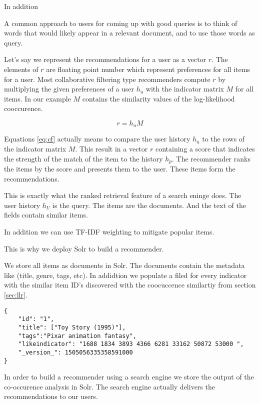 In addition 

A common approach to users for coming up with good queries is to think of words that would likely appear in a relevant document, and to use those words as query.

Let's say we represent the recommendations for a user as a vector $r$. The elements of $r$ are floating point number which represent preferences for all items for a user. Most collaborative filtering type recommenders compute $r$ by multiplying the given preferences of a user $h_u$ with the indicator matrix $M$ for all items. In our example $M$ contains the similarity values of the log-likelihood cooccurence.

\begin{equation}
  \label{eq:cf}
  r = h_u M
\end{equation}

Equations \ref{eq:cf} actually means to compare the user history $h_u$ to the rows of the indicator matrix $M$. This result in a vector $r$ containing a score that indicates the strength of the match of the item to the history $h_p$. The recommender ranks the items by the score and presents them to the user. These items form the recommendations.

This is exactly what the ranked retrieval feature of a search eninge does.
The user history $h_U$ is the query. The items are the documents. And the text of the fields contain similar items.

In addition we can use TF-IDF \cite{Manning} weighting to mitigate popular items.

This is why we deploy Solr to build a recommender.

We store all items as documents in Solr. The documents contain the metadata like (title, genre, tags, etc). In addidtion we populate a filed for every indicator with the similar item ID's discovered with the coocuccence similartiy from section \ref{sec:llr}.

\begin{lstlisting}[caption={Item metadata and similar items are stored in Solr.},label={lst:solrdoc}]
{
    "id": "1",
    "title": ["Toy Story (1995)"],
    "tags":"Pixar animation fantasy",
    "likeindicator": "1688 1834 3893 4366 6281 33162 50872 53000 ",
    "_version_": 1505056335358591000
}
\end{lstlisting}

In order to build a recommender using a search engine we store the output of the co-occurence analysis in Solr. The search engine actually delivers the recommendations to our users.

